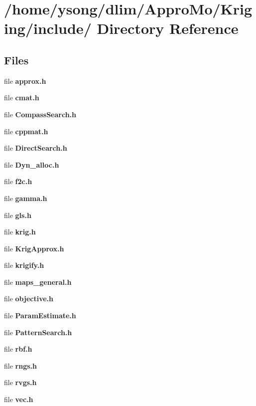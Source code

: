 \section{/home/ysong/dlim/Appro\-Mo/Kriging/include/ Directory Reference}
\label{dir_000000}
\subsection*{Files}
\begin{CompactItemize}
\item 
file {\bf approx.h}
\item 
file {\bf cmat.h}
\item 
file {\bf CompassSearch.h}
\item 
file {\bf cppmat.h}
\item 
file {\bf DirectSearch.h}
\item 
file {\bf Dyn_alloc.h}
\item 
file {\bf f2c.h}
\item 
file {\bf gamma.h}
\item 
file {\bf gls.h}
\item 
file {\bf krig.h}
\item 
file {\bf Krig\-Approx.h}
\item 
file {\bf krigify.h}
\item 
file {\bf maps_general.h}
\item 
file {\bf objective.h}
\item 
file {\bf ParamEstimate.h}
\item 
file {\bf PatternSearch.h}
\item 
file {\bf rbf.h}
\item 
file {\bf rngs.h}
\item 
file {\bf rvgs.h}
\item 
file {\bf vec.h}
\end{CompactItemize}
